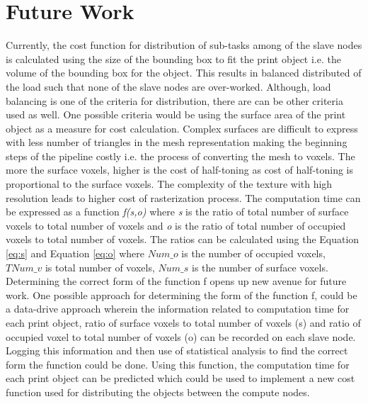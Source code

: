 \newpage   
\chapter{Future Work}

Currently, the cost function for distribution of sub-tasks among of the slave nodes is calculated using the size of the bounding box to fit the print object i.e. the volume of the bounding box for the object. This results in balanced distributed of the load such that none of the slave nodes are over-worked. Although, load balancing is one of the criteria for distribution, there are can be other criteria used as well. One possible criteria would be using the surface area of the print object as a measure for cost calculation. Complex surfaces are difficult to express with less number of triangles in the mesh representation making the beginning steps of the pipeline costly i.e. the process of converting the mesh to voxels. The more the surface voxels, higher is the cost of half-toning as cost of half-toning is proportional to the surface voxels. The complexity of the texture with high resolution leads to higher cost of rasterization process. The computation time can be expressed as a function \textit{f(s,o)} where \textit{s} is the ratio of total number of surface voxels to total number of voxels and \textit{o} is the ratio of total number of occupied voxels to total number of voxels. The ratios can be calculated using the Equation \ref{eq:s} and Equation \ref{eq:o} where \begin{math}Num\_{o} \end{math} is the number of occupied voxels, \begin{math} TNum\_{v} \end{math} is total number of voxels, \begin{math}Num\_{s} \end{math} is the number of surface voxels. Determining the correct form of the function f opens up new avenue for future work. One possible approach for determining the form of the function f, could be a data-drive approach wherein the information related to computation time for each print object, ratio of surface voxels to total number of voxels (s) and ratio of occupied voxel to total number of voxels (o) can be recorded on each slave node. Logging this information and then use of statistical analysis to find the correct form the function could be done. Using this function, the computation time for each print object can be predicted which could be used to implement a new cost function used for distributing the objects between the compute nodes.  

